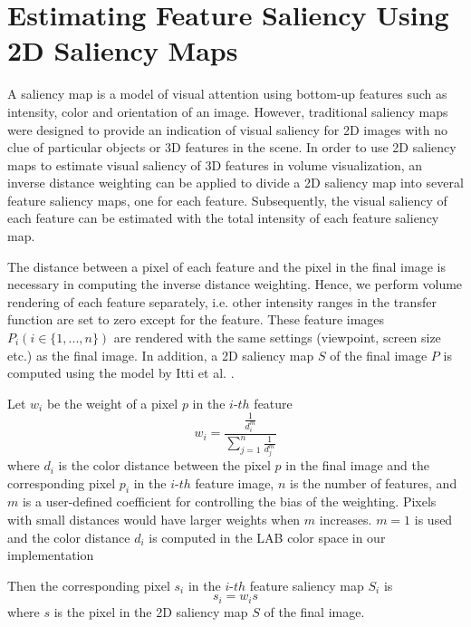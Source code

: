 \chapter{Estimating Feature Saliency Using 2D Saliency Maps \label{2d_saliency_map}}

A saliency map is a model of visual attention using bottom-up features such as intensity, color and orientation of an image.
However, traditional saliency maps were designed to provide an indication of visual saliency for 2D images with no clue of particular objects or 3D features in the scene.
In order to use 2D saliency maps \cite{itti_model_1998} to estimate visual saliency of 3D features in volume visualization, an inverse distance weighting \cite{shepard_two-dimensional_1968} can be applied to divide a 2D saliency map into several feature saliency maps, one for each feature. Subsequently, the visual saliency of each feature can be estimated with the total intensity of each feature saliency map.

The distance between a pixel of each feature and the pixel in the final image is necessary in computing the inverse distance weighting.
Hence, we perform volume rendering of each feature separately, i.e. other intensity ranges in the transfer function are set to zero except for the feature.
These feature images $ P_{i} (i \in \{1,...,n\})$ are rendered with the same settings (viewpoint, screen size etc.) as the final image.
In addition, a 2D saliency map $ S $ of the final image $ P $ is computed using the model by Itti et al. \cite{itti_model_1998}.

Let $ w_{i} $ be the weight of a pixel $ p $ in the $i$-$th$ feature
\[ w_{i} = \frac{ \frac{1}{d_{i}^{m}} }{ \sum_{j=1}^{n} \frac{1}{d_{j}^{m}} } \]
where $ d_{i} $ is the color distance between the pixel $ p $ in the final image and the corresponding pixel $ p_{i} $ in the $i$-$th$ feature image,
$ n $ is the number of features, and
$ m $ is a user-defined coefficient for controlling the bias of the weighting. Pixels with small distances would have larger weights when $ m $ increases. $ m=1 $ is used and the color distance $ d_{i} $ is computed in the LAB color space in our implementation

Then the corresponding pixel $ s_{i} $ in the $i$-$th$  feature saliency map $ S_{i} $ is
\[ s_{i}=w_{i}s \]
where $ s $ is the pixel in the 2D saliency map $ S $ of the final image.


